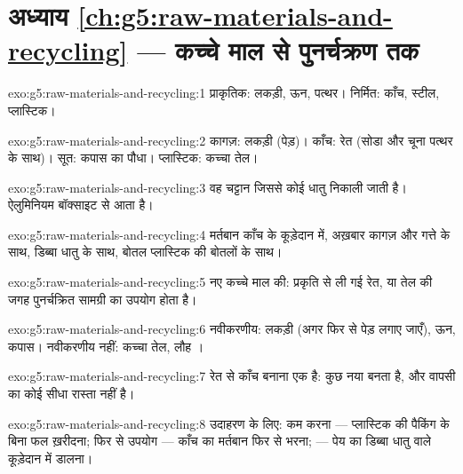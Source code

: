 \section*{अध्याय \ref{ch:g5:raw-materials-and-recycling} --- कच्चे माल से पुनर्चक्रण तक}

\begin{solution}{exo:g5:raw-materials-and-recycling:1}
प्राकृतिक: लकड़ी, ऊन, पत्थर। निर्मित: काँच, स्टील, प्लास्टिक।
\end{solution}

\begin{solution}{exo:g5:raw-materials-and-recycling:2}
कागज़: लकड़ी (पेड़)। काँच: रेत (सोडा और चूना पत्थर के साथ)। सूत:
कपास का पौधा। प्लास्टिक: कच्चा तेल।
\end{solution}

\begin{solution}{exo:g5:raw-materials-and-recycling:3}
वह चट्टान जिससे कोई धातु निकाली जाती है। ऐलुमिनियम बॉक्साइट से आता है।
\end{solution}

\begin{solution}{exo:g5:raw-materials-and-recycling:4}
मर्तबान काँच के कूड़ेदान में, अख़बार कागज़ और गत्ते के साथ, डिब्बा
धातु के साथ, बोतल प्लास्टिक की बोतलों के साथ।
\end{solution}

\begin{solution}{exo:g5:raw-materials-and-recycling:5}
नए कच्चे माल की: प्रकृति से ली गई रेत,  या तेल की जगह पुनर्चक्रित
सामग्री का उपयोग होता है।
\end{solution}

\begin{solution}{exo:g5:raw-materials-and-recycling:6}
नवीकरणीय: लकड़ी (अगर फिर से पेड़ लगाए जाएँ), ऊन, कपास। नवीकरणीय नहीं: कच्चा तेल,
लौह ।
\end{solution}

\begin{solution}{exo:g5:raw-materials-and-recycling:7}
रेत से काँच बनाना एक  है: कुछ नया बनता है, और वापसी
का कोई सीधा रास्ता नहीं है।
\end{solution}

\begin{solution}{exo:g5:raw-materials-and-recycling:8}
उदाहरण के लिए: कम करना --- प्लास्टिक की पैकिंग के बिना फल ख़रीदना; फिर से उपयोग ---
काँच का मर्तबान फिर से भरना;  --- पेय का डिब्बा धातु वाले कूड़ेदान में डालना।
\end{solution}

